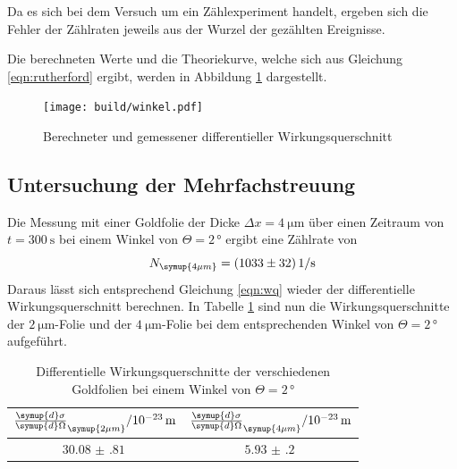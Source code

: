 Da es sich bei dem Versuch um ein Zählexperiment handelt, ergeben sich die Fehler der Zählraten jeweils aus der Wurzel der gezählten Ereignisse.

Die berechneten Werte und die Theoriekurve, welche sich aus Gleichung \ref{eqn:rutherford} ergibt, werden in Abbildung \ref{fig:wirkungsquerschnitt} dargestellt.

\begin{figure}[H]
  \centering
  \texttt{[image: build/winkel.pdf]}
  \caption{Berechneter und gemessener differentieller Wirkungsquerschnitt}
  \label{fig:wirkungsquerschnitt}
\end{figure}



\subsection{Untersuchung der Mehrfachstreuung}
Die Messung mit einer Goldfolie der Dicke $\Delta x = \SI{4}{\micro\meter}$ über einen
Zeitraum von $t = \SI{300}{\second}$ bei einem Winkel von $\Theta = 2 \, °$ ergibt
eine Zählrate von
\begin{equation*}
  N_\symup{4\mu m} = \SI{1033(32)}{1\per\second}
\end{equation*}
Daraus lässt sich entsprechend Gleichung \ref{eqn:wq} wieder der differentielle Wirkungsquerschnitt
berechnen. In Tabelle \ref{tab:wq} sind nun die Wirkungsquerschnitte der $\SI{2}{\micro\meter}$-Folie
und der $\SI{4}{\micro\meter}$-Folie bei dem entsprechenden Winkel von $\Theta = 2 \, °$ aufgeführt.
\begin{table}[H]
  \centering
  \caption{Differentielle Wirkungsquerschnitte der verschiedenen Goldfolien bei einem Winkel von $\Theta = 2 \, °$}
  \label{tab:wq}
  \begin{tabular}{c c}
    \toprule
    $\frac{\symup{d}\sigma}{\symup{d}\Omega}_\symup{2\mu m} /  10^{-23}\, \mathrm{m}$ & $\frac{\symup{d}\sigma}{\symup{d}\Omega}_\symup{4\mu m}/ 10^{-23}\, \mathrm{m}$ \\
    \midrule
    $\SI{30.08(81)}{}$ & $\SI{5.93(20)}{}$  \\
    \bottomrule
  \end{tabular}
\end{table}


